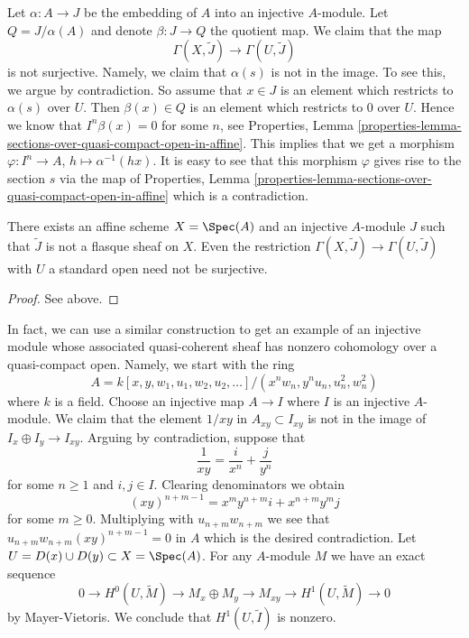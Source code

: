 \medskip\noindent
Let $\alpha : A \to J$ be the embedding of $A$ into an injective $A$-module.
Let $Q = J/\alpha(A)$ and denote $\beta : J \to Q$ the quotient map.
We claim that the map
$$
\Gamma(X, \widetilde{J})
\longrightarrow
\Gamma(U, \widetilde{J})
$$
is not surjective. Namely, we claim that $\alpha(s)$ is not in the image.
To see this, we argue by contradiction. So assume that $x \in J$ is an
element which restricts to $\alpha(s)$ over $U$. Then $\beta(x) \in Q$
is an element which restricts to $0$ over $U$. Hence we know that
$I^n\beta(x) = 0$ for some $n$, see
Properties,
Lemma \ref{properties-lemma-sections-over-quasi-compact-open-in-affine}.
This implies that we get a morphism
$\varphi : I^n \to A$, $h \mapsto \alpha^{-1}(hx)$. It is easy to see that
this morphism $\varphi$ gives rise to the section $s$ via the map of
Properties,
Lemma \ref{properties-lemma-sections-over-quasi-compact-open-in-affine}
which is a contradiction.

\begin{lemma}
\label{lemma-nonflasque}
There exists an affine scheme $X = \Spec(A)$ and an injective
$A$-module $J$ such that $\widetilde{J}$ is not a flasque sheaf on $X$.
Even the restriction $\Gamma(X, \widetilde{J}) \to \Gamma(U, \widetilde{J})$
with $U$ a standard open need not be surjective.
\end{lemma}

\begin{proof}
See above.
\end{proof}

\noindent
In fact, we can use a similar construction to get an example of an
injective module whose associated quasi-coherent sheaf has nonzero
cohomology over a quasi-compact open. Namely, we start with the ring
$$
A = k[x, y, w_1, u_1, w_2, u_2, \ldots]/(x^nw_n, y^nu_n, u_n^2, w_n^2)
$$
where $k$ is a field. Choose an injective map $A \to I$ where $I$ is an
injective $A$-module. We claim that the element $1/xy$ in
$A_{xy} \subset I_{xy}$ is not in the image of $I_x \oplus I_y \to I_{xy}$.
Arguing by contradiction, suppose that
$$
\frac{1}{xy} = \frac{i}{x^n} + \frac{j}{y^n}
$$
for some $n \geq 1$ and $i, j \in I$. Clearing denominators we obtain
$$
(xy)^{n + m - 1} = x^my^{n + m}i + x^{n + m}y^mj
$$
for some $m \geq 0$. Multiplying with $u_{n + m}w_{n + m}$ we see
that $u_{n + m}w_{n + m}(xy)^{n + m - 1} = 0$ in $A$ which is the
desired contradiction.
Let $U = D(x) \cup D(y) \subset X = \Spec(A)$. For any $A$-module
$M$ we have an exact sequence
$$
0 \to H^0(U, \widetilde{M}) \to M_x \oplus M_y \to M_{xy} \to
H^1(U, \widetilde{M}) \to 0
$$
by Mayer-Vietoris. We conclude that $H^1(U, \widetilde{I})$ is nonzero.

